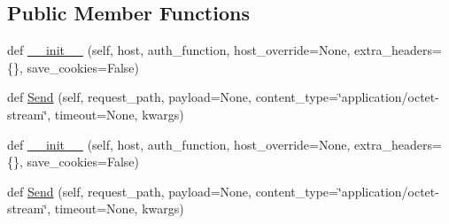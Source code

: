 \subsection*{Public Member Functions}
\begin{DoxyCompactItemize}
\item 
def \hyperlink{classupload_1_1_abstract_rpc_server_a3f6bc1bd16b52bd5a5c33a1fedeef2d0}{\+\_\+\+\_\+init\+\_\+\+\_\+} (self, host, auth\+\_\+function, host\+\_\+override=None, extra\+\_\+headers=\{\}, save\+\_\+cookies=False)
\item 
def \hyperlink{classupload_1_1_abstract_rpc_server_ac1b913f8bd00da4741c47ab49ea94cb5}{Send} (self, request\+\_\+path, payload=None, content\+\_\+type=\char`\"{}application/octet-\/stream\char`\"{}, timeout=None, kwargs)
\item 
def \hyperlink{classupload_1_1_abstract_rpc_server_a3f6bc1bd16b52bd5a5c33a1fedeef2d0}{\+\_\+\+\_\+init\+\_\+\+\_\+} (self, host, auth\+\_\+function, host\+\_\+override=None, extra\+\_\+headers=\{\}, save\+\_\+cookies=False)
\item 
def \hyperlink{classupload_1_1_abstract_rpc_server_ac1b913f8bd00da4741c47ab49ea94cb5}{Send} (self, request\+\_\+path, payload=None, content\+\_\+type=\char`\"{}application/octet-\/stream\char`\"{}, timeout=None, kwargs)
\end{DoxyCompactItemize}
